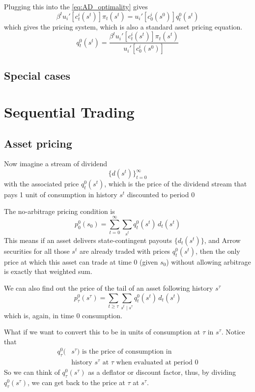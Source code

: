 \documentclass[twocolumn, fleqn]{article}
\numberwithin{equation}{section}
\begin{document}
	Plugging this into the \eqref{eq:AD_optimality} gives
	\begin{equation*}
		\beta^t u_i'\left[c_t^i(s^t)\right] \pi_t(s^t) =  u_i'\left[c_0^i(s^0)\right] q_t^0(s^t)
	\end{equation*}
	which gives the pricing system, which is also a standard asset pricing equation.
	\begin{equation}
		q_t^0(s^t) = \frac{\beta^t u_i'\left[c_t^i(s^t)\right] \pi_t(s^t)}{u_i'\left[c_0^i(s^0)\right]}
	\end{equation}
	
	\subsection{Special cases}
	
	\section{Sequential Trading}
	\subsection{Asset pricing}
	Now imagine a stream of dividend 
	\begin{equation*}
		\{ d(s^t)\}_{t=0}^{\infty}
	\end{equation*}
	with the associated price $q_t^0(s^t)$, which is the price of the dividend stream that pays 1 unit of consumption in history $s^t$ discounted to period 0
	
	The no-arbitrage pricing condition is 
	\begin{equation}
		p_0^0(s_0) = \sum_{t=0}^\infty \sum_{s^t} q_t^0(s^t) \, d_t(s^t)
	\end{equation}
	This means if an asset delivers state-contingent payouts $\{ d_t(s^t) \}$, and Arrow securities for all those $s^t$ are already traded with prices $q_t^0(s^t)$, then the only price at which this asset can trade at time 0 (given $s_0$) without allowing arbitrage is exactly that weighted sum.
	
	We can also find out the price of the tail of an asset following history $s^\tau$
	\begin{equation}
		p_\tau^0(s^\tau) = \sum_{t \geq \tau} \sum_{s^t \mid s^\tau} q_t^0(s^t) \, d_t(s^t)
	\end{equation}
	which is, again, in time 0 consumption.
	
	What if we want to convert this to be in units of consumption at $\tau$ in $s^\tau$. Notice that 
	\begin{align*}
		q_\tau^0(&s^\tau) \text{ is the price of consumption in }\\
		&\text{history $s^\tau$ at $\tau$ when evaluated at period 0}
	\end{align*}
	So we can think of $q_\tau^0(s^\tau)$ as a deflator or discount factor, thus, by dividing $q_\tau^0(s^\tau)$, we can get back to the price at $\tau$ at $s^\tau$. 
	
\end{document}

